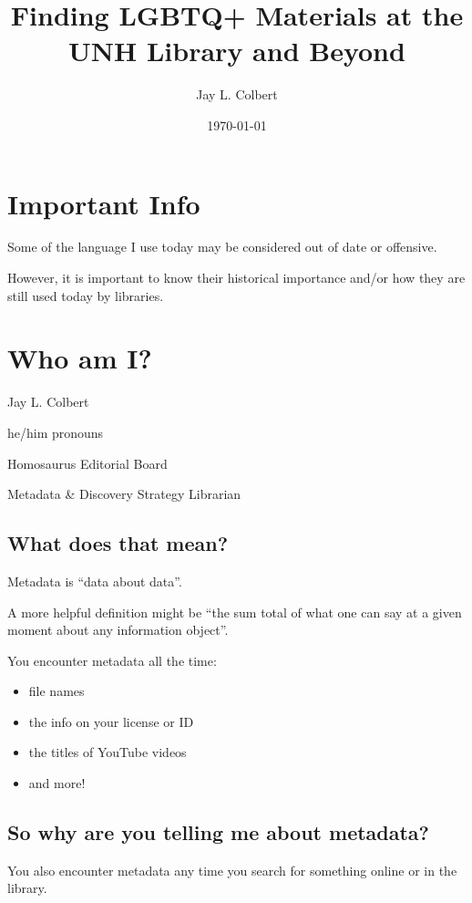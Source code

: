 \documentclass[11pt]{article}
\author{Jay L. Colbert}
\date{\today}
\title{Finding LGBTQ+ Materials at the UNH Library and Beyond}
\begin{document}
\maketitle
\tableofcontents



\section*{Important Info}
\label{sec:org11db322}

Some of the language I use today may be considered out of date or offensive.

However, it is important to know their historical importance and/or how they are still used today by libraries.

\section*{Who am I?}
\label{sec:orga2452bf}

Jay L. Colbert

he/him pronouns

Homosaurus Editorial Board

Metadata \& Discovery Strategy Librarian

\subsection*{What does that mean?}
\label{sec:org3c2904c}

Metadata is ``data about data''.

A more helpful definition might be ``the sum total of what one can say at a given moment about any information object''.

You encounter metadata all the time:

\begin{itemize}
\item file names
\item the info on your license or ID
\item the titles of YouTube videos
\item and more!
\end{itemize}

\subsection*{So why are you telling me about metadata?}
\label{sec:orgb618add}

You also encounter metadata any time you search for something online or in the library.
\end{document}
